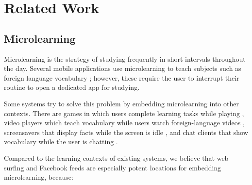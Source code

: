 \documentclass{sigchi}
\begin{document}
\section{Related Work}

\subsection{Microlearning}

Microlearning is the strategy of studying frequently in short intervals throughout the day. Several mobile applications use microlearning to teach subjects such as foreign language vocabulary \cite{microlearning} \cite{micromandarin}; however, these require the user to interrupt their routine to open a dedicated app for studying. %

Some systems try to solve this problem by embedding microlearning into other contexts. There are games in which users complete learning tasks while playing \cite{carriearcade}, video players which teach vocabulary while users watch foreign-language videos \cite{smartsubtitles}, screensavers that display facts while the screen is idle \cite{screensaver}, and chat clients that show vocabulary while the user is chatting \cite{cai2015wait}.


Compared to the learning contexts of existing systems, we believe that web surfing and Facebook feeds are especially potent locations for embedding microlearning, because:
\end{document}
